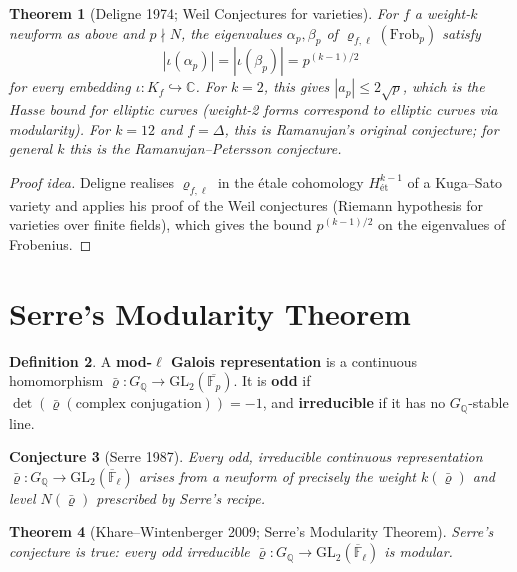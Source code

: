 \documentclass[a4paper,12pt]{amsart}
\newtheorem{theorem}{Theorem}[section]
\newtheorem{conjecture}[theorem]{Conjecture}
\theoremstyle{definition}
\newtheorem{definition}[theorem]{Definition}
\theoremstyle{remark}
\newcommand{\Q}{\mathbb{Q}}
\newcommand{\Fp}{\mathbb{F}_p}
\newcommand{\GL}{\mathrm{GL}}
\newcommand{\Frob}{\mathrm{Frob}}
\begin{document}
\begin{theorem}[Deligne 1974; Weil Conjectures for varieties]
\label{thm:ramanujan-deligne}
For $f$ a weight-$k$ newform as above and $p \nmid N$, the eigenvalues
$\alpha_p, \beta_p$ of $\varrho_{f,\ell}(\Frob_p)$ satisfy
\[
  |\iota(\alpha_p)| = |\iota(\beta_p)| = p^{(k-1)/2}
\]
for every embedding $\iota\colon K_f \hookrightarrow \mathbb{C}$.
For $k = 2$, this gives $|a_p| \leq 2\sqrt{p}$, which is the \emph{Hasse bound}
for elliptic curves (weight-2 forms correspond to elliptic curves via
modularity).  For $k = 12$ and $f = \Delta$, this is Ramanujan's original
conjecture; for general $k$ this is the \emph{Ramanujan--Petersson conjecture}.
\end{theorem}

\begin{proof}[Proof idea]
Deligne realises $\varrho_{f,\ell}$ in the étale cohomology $H^{k-1}_{\text{ét}}$
of a Kuga--Sato variety and applies his proof of the Weil conjectures (Riemann
hypothesis for varieties over finite fields), which gives the bound $p^{(k-1)/2}$
on the eigenvalues of Frobenius.
\end{proof}

\section{Serre's Modularity Theorem}
\label{sec:serre}

\begin{definition}
A \textbf{mod-$\ell$ Galois representation} is a continuous homomorphism
$\bar{\varrho}\colon G_\Q \to \GL_2(\overline{\Fp})$.
It is \textbf{odd} if $\det(\bar{\varrho}(\text{complex conjugation})) = -1$,
and \textbf{irreducible} if it has no $G_\Q$-stable line.
\end{definition}

\begin{conjecture}[Serre 1987]
Every odd, irreducible continuous representation
$\bar{\varrho}\colon G_\Q \to \GL_2(\overline{\mathbb{F}}_\ell)$
arises from a newform of precisely the weight $k(\bar{\varrho})$ and level
$N(\bar{\varrho})$ prescribed by Serre's recipe.
\end{conjecture}

\begin{theorem}[Khare--Wintenberger 2009; Serre's Modularity Theorem]
\label{thm:serre}
Serre's conjecture is true: every odd irreducible
$\bar{\varrho}\colon G_\Q \to \GL_2(\overline{\mathbb{F}}_\ell)$
is modular.
\end{theorem}
\end{document}
